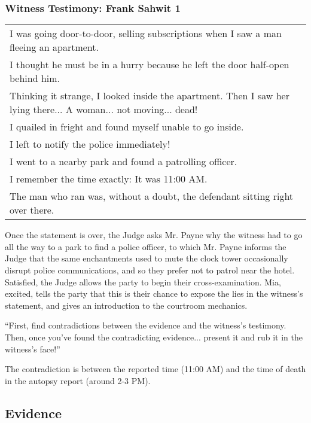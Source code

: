 \subsubsection{Witness Testimony: Frank Sahwit 1}
\begin{center}
\begin{tabular}{p{4in}}
I was going door-to-door, selling subscriptions when I saw a man fleeing an apartment.\\
I thought he must be in a hurry because he left the door half-open behind him. \\
Thinking it strange, I looked inside the apartment. Then I saw her lying there... A woman... not moving... dead! \\
I quailed in fright and found myself unable to go inside. \\
I left to notify the police immediately! \\
I went to a nearby park and found a patrolling officer. \\
I remember the time exactly: It was 11:00 AM. \\
The man who ran was, without a doubt, the defendant sitting right over there. \\
\end{tabular}
\end{center}

Once the statement is over, the Judge asks Mr. Payne why the witness had to go all the way to a park to find a police officer, to which Mr. Payne informs the Judge that the same enchantments used to mute the clock tower occasionally disrupt police communications, and so they prefer not to patrol near the hotel. Satisfied, the Judge allows the party to begin their cross-examination. Mia, excited, tells the party that this is their chance to expose the lies in the witness's statement, and gives an introduction to the courtroom mechanics.

\begin{center}
``First, find contradictions between the evidence and the witness's testimony. Then, once you've found the contradicting evidence... present it and rub it in the witness's face!''
\end{center}

The contradiction is between the reported time (11:00 AM) and the time of death in the autopsy report (around 2-3 PM).

\subsection{Evidence}
